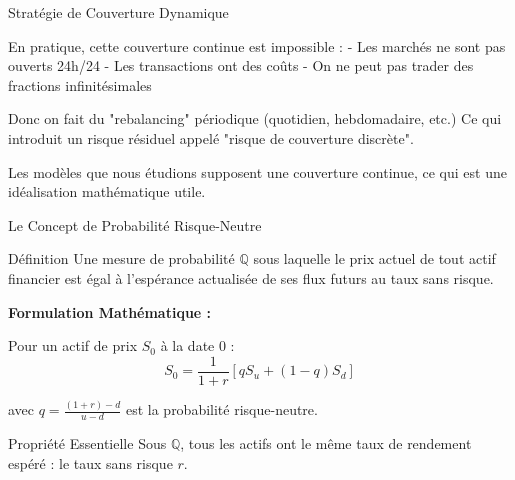 \documentclass[aspectratio=169, 10pt]{beamer}
\begin{document}
\begin{frame}{Stratégie de Couverture Dynamique}
{        En pratique, cette couverture continue est impossible :
        - Les marchés ne sont pas ouverts 24h/24
        - Les transactions ont des coûts
        - On ne peut pas trader des fractions infinitésimales
        
        Donc on fait du "rebalancing" périodique (quotidien, hebdomadaire, etc.)
        Ce qui introduit un risque résiduel appelé "risque de couverture discrète".
        
        Les modèles que nous étudions supposent une couverture continue,
        ce qui est une idéalisation mathématique utile.
    }
\end{frame}

\begin{frame}{Le Concept de Probabilité Risque-Neutre}
    \begin{block}{Définition}
    Une mesure de probabilité $\mathbb{Q}$ sous laquelle le prix actuel de tout actif financier est égal à l'espérance actualisée de ses flux futurs au taux sans risque.
    \end{block}
    
    \vspace{0.3cm}
    \textbf{Formulation Mathématique :}
    
    Pour un actif de prix $S_0$ à la date 0 :
    $$S_0 = \frac{1}{1 + r} \left[q S_u + (1 - q) S_d\right]$$
    
    avec $q = \frac{(1+r)-d}{u-d}$ est la probabilité risque-neutre.
    
    \vspace{0.3cm}
    \begin{block}{Propriété Essentielle}
    Sous $\mathbb{Q}$, tous les actifs ont le même taux de rendement espéré : le taux sans risque $r$.
    \end{block}
\end{frame}
\end{document}
